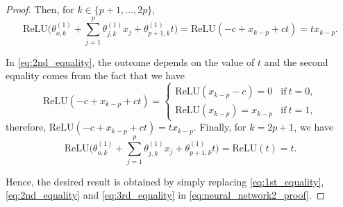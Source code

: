 \documentclass{article}
\begin{document}
\begin{proof}
Then, for $k \in \{p+1, \ldots, 2p\}$,
\begin{equation}
    \mathrm{ReLU}\Big(\theta_{o,k}^{(1)} + \sum_{j=1}^{p} \theta_{j,k}^{(1)} x_j +  \theta_{p+1,k}^{(1)} t \Big) = \mathrm{ReLU}(-c + x_{k-p} + ct) = t x_{k-p}.
    \label{eq:2nd_equality}
\end{equation}

In \eqref{eq:2nd_equality}, the outcome depends on the value of $t$ and the second equality comes from the fact that we have
\[ \mathrm{ReLU}(-c + x_{k-p} + ct) = 
    \left\{ \begin{array}{ll}
     \mathrm{ReLU}(x_{k-p} - c) = 0 & \mathrm{if}~t = 0,\\
      \mathrm{ReLU}(x_{k-p}) = x_{k-p} & \mathrm{if}~t=1,
            \end{array} \right.
\]
therefore, $\mathrm{ReLU}(-c + x_{k-p} + ct) = t x_{k-p}$. Finally, for $k=2p+1$, we have
\begin{equation}
    \mathrm{ReLU}\Big(\theta_{o,k}^{(1)} + \sum_{j=1}^{p} \theta_{j,k}^{(1)} x_j +  \theta_{p+1,k}^{(1)} t \Big) = \mathrm{ReLU}(t) = t.
    \label{eq:3rd_equality}
\end{equation}

Hence, the desired result is obtained by simply replacing \eqref{eq:1st_equality}, \eqref{eq:2nd_equality} and \eqref{eq:3rd_equality} in \eqref{eq:neural_network2_proof}.
\end{proof}
\end{document}
